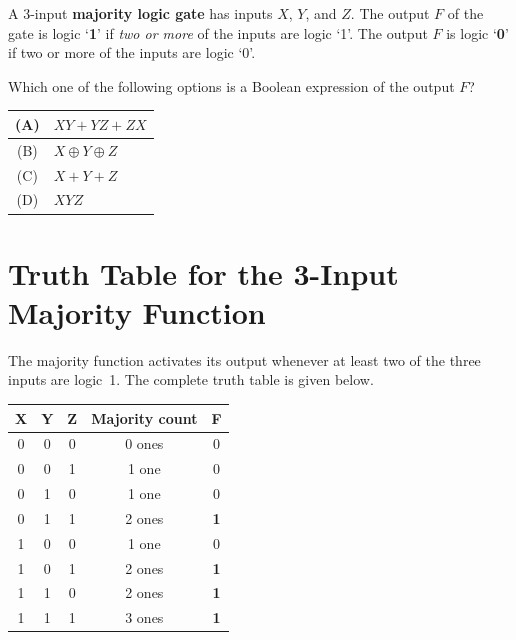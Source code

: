 \documentclass[12pt, a4paper]{article}
\newcommand{\qstart}[2]{%
  \begin{tcolorbox}[colback=shadegray, colframe=gateblue,
      title={\textbf{#1}}, fonttitle=\bfseries\large, arc=4pt,
      left=6pt, right=6pt, top=4pt, bottom=4pt]
  #2
}
\newcommand{\qcont}[1]{#1}
\newcommand{\qend}{\end{tcolorbox}}
\begin{document}
\qstart{Q.23}{%
  A 3-input \textbf{majority logic gate} has inputs $X$, $Y$, and $Z$.
  The output $F$ of the gate is logic `\textbf{1}' if \emph{two or more}
  of the inputs are logic `1'. The output $F$ is logic `\textbf{0}' if
  two or more of the inputs are logic `0'.

  \medskip
  Which one of the following options is a Boolean expression of the
  output $F$?%
}

\qcont{%
  \begin{center}
    \renewcommand{\arraystretch}{1.5}
    \begin{tabular}{|c|p{8cm}|}
      \hline
      (A) & $XY + YZ + ZX$ \\
      \hline
      (B) & $X \oplus Y \oplus Z$ \\
      \hline
      (C) & $X + Y + Z$ \\
      \hline
      (D) & $XYZ$ \\
      \hline
    \end{tabular}
  \end{center}
}
\qend

\section*{Truth Table for the 3-Input Majority Function}

The majority function activates its output whenever at least two of the
three inputs are logic~1. The complete truth table is given below.

\begin{center}
  \renewcommand{\arraystretch}{1.3}
  \begin{tabular}{|c|c|c||c|c|}
    \hline
    \textbf{X} & \textbf{Y} & \textbf{Z} &
    \textbf{Majority count} & \textbf{F} \\
    \hline
    0 & 0 & 0 & 0 ones & 0 \\
    0 & 0 & 1 & 1 one & 0 \\
    0 & 1 & 0 & 1 one & 0 \\
    0 & 1 & 1 & 2 ones & \textbf{1} \\
    1 & 0 & 0 & 1 one & 0 \\
    1 & 0 & 1 & 2 ones & \textbf{1} \\
    1 & 1 & 0 & 2 ones & \textbf{1} \\
    1 & 1 & 1 & 3 ones & \textbf{1} \\
    \hline
  \end{tabular}
\end{center}
\end{document}
